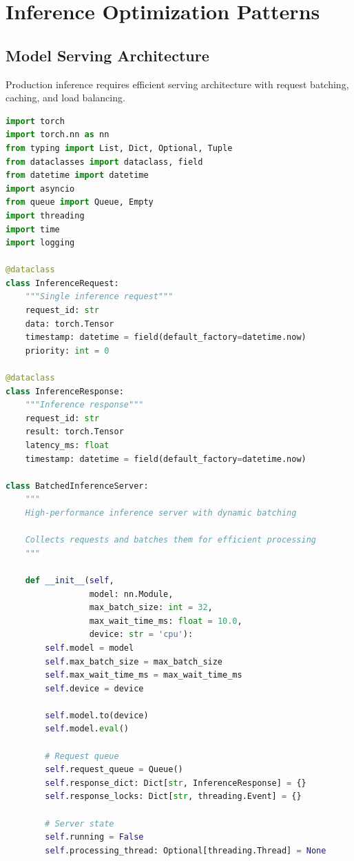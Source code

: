 \section{Inference Optimization Patterns}

\subsection{Model Serving Architecture}

Production inference requires efficient serving architecture with request batching, caching, and load balancing.

\begin{lstlisting}[language=Python, caption=Optimized Inference Server]
import torch
import torch.nn as nn
from typing import List, Dict, Optional, Tuple
from dataclasses import dataclass, field
from datetime import datetime
import asyncio
from queue import Queue, Empty
import threading
import time
import logging

@dataclass
class InferenceRequest:
    """Single inference request"""
    request_id: str
    data: torch.Tensor
    timestamp: datetime = field(default_factory=datetime.now)
    priority: int = 0

@dataclass
class InferenceResponse:
    """Inference response"""
    request_id: str
    result: torch.Tensor
    latency_ms: float
    timestamp: datetime = field(default_factory=datetime.now)

class BatchedInferenceServer:
    """
    High-performance inference server with dynamic batching

    Collects requests and batches them for efficient processing
    """

    def __init__(self,
                 model: nn.Module,
                 max_batch_size: int = 32,
                 max_wait_time_ms: float = 10.0,
                 device: str = 'cpu'):
        self.model = model
        self.max_batch_size = max_batch_size
        self.max_wait_time_ms = max_wait_time_ms
        self.device = device

        self.model.to(device)
        self.model.eval()

        # Request queue
        self.request_queue = Queue()
        self.response_dict: Dict[str, InferenceResponse] = {}
        self.response_locks: Dict[str, threading.Event] = {}

        # Server state
        self.running = False
        self.processing_thread: Optional[threading.Thread] = None


\end{lstlisting}
